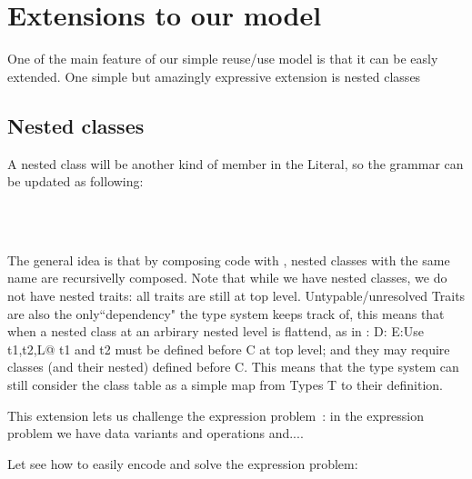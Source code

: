 \section{Extensions to our model}
  One of the main feature of our simple reuse/use model is that it can be
  easly extended. One simple but amazingly expressive extension is nested classes

\subsection{Nested classes}

A nested class will be another kind of member in the Literal, so  
the grammar can be updated as following:

\begin{bnf}
\prodFull{}\\
\prodFull{}
\end{bnf}\\

The general idea is that by composing code with \use, nested classes with the same name are recursivelly composed.
Note that while we have nested classes, we do not have nested traits: all traits are still
at top level.
Untypable/unresolved Traits are also the only``dependency"
the type system keeps track of, this means that when a nested class at an arbirary
nested level is flattend, as in
\Q@C:{ D:{ E:Use t1,t2,L}}@
t1 and t2 must be defined before C at top level; and they may require classes (and their
nested) defined before C. This means that the type system can still consider
the class table as a simple map from Types T to their definition.

This extension lets us challenge the expression problem~\cite{wadler1998expression}:
in the expression problem we have data variants and operations and....

Let see how to easily encode and solve the expression problem:

